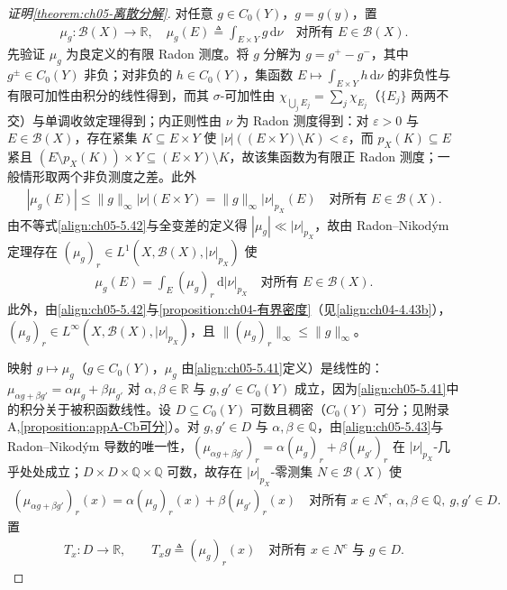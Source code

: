 \documentclass[../../main.tex]{subfiles}%
\begin{document}
\begin{proof}[证明\cref{theorem:ch05-离散分解}]
对任意 $g\in C_0(Y)$，$g=g(y)$，置
\begin{align}
\mu_g:\mathscr{B}(X)\to\mathbb{R},\quad
\mu_g(E)\triangleq \int_{E\times Y}g\,\mathrm{d}\nu
\quad\text{对所有 }E\in\mathscr{B}(X).\label{align:ch05-5.41}
\end{align}
先验证 $\mu_g$ 为良定义的有限 Radon 测度。将 $g$ 分解为 $g=g^+-g^-$，其中 $g^\pm\in C_0(Y)$ 非负；对非负的 $h\in C_0(Y)$，集函数 $E\mapsto\int_{E\times Y}h\,\mathrm{d}\nu$ 的非负性与有限可加性由积分的线性得到，而其 $\sigma$-可加性由 $\chi_{\bigcup_jE_j}=\sum_j\chi_{E_j}$（$\{E_j\}$ 两两不交）与单调收敛定理得到；内正则性由 $\nu$ 为 Radon 测度得到：对 $\varepsilon>0$ 与 $E\in\mathscr{B}(X)$，存在紧集 $K\subseteq E\times Y$ 使 $|\nu|((E\times Y)\setminus K)<\varepsilon$，而 $p_X(K)\subseteq E$ 紧且 $(E\setminus p_X(K))\times Y\subseteq(E\times Y)\setminus K$，故该集函数为有限正 Radon 测度；一般情形取两个非负测度之差。此外
\begin{align}
|\mu_g(E)|\leqslant\|g\|_\infty|\nu|(E\times Y)
=\|g\|_\infty|\nu|_{p_X}(E)
\quad\text{对所有 }E\in\mathscr{B}(X).\label{align:ch05-5.42}
\end{align}
由不等式\eqref{align:ch05-5.42}与全变差的定义得 $|\mu_g|\ll|\nu|_{p_X}$，故由 Radon--Nikodým 定理存在 $(\mu_g)_r\in L^1(X,\mathscr{B}(X),|\nu|_{p_X})$ 使
\begin{align}
\mu_g(E)=\int_E(\mu_g)_r\,\mathrm{d}|\nu|_{p_X}
\quad\text{对所有 }E\in\mathscr{B}(X).\label{align:ch05-5.43}
\end{align}
此外，由\eqref{align:ch05-5.42}与\cref{proposition:ch04-有界密度}（见\eqref{align:ch04-4.43b}），$(\mu_g)_r\in L^\infty(X,\mathscr{B}(X),|\nu|_{p_X})$，且 $\|(\mu_g)_r\|_\infty\leqslant\|g\|_\infty$。

映射 $g\mapsto\mu_g$（$g\in C_0(Y)$，$\mu_g$ 由\eqref{align:ch05-5.41}定义）是线性的：$\mu_{\alpha g+\beta g'}=\alpha\mu_g+\beta\mu_{g'}$ 对 $\alpha,\beta\in\mathbb{R}$ 与 $g,g'\in C_0(Y)$ 成立，因为\eqref{align:ch05-5.41}中的积分关于被积函数线性。设 $D\subseteq C_0(Y)$ 可数且稠密（$C_0(Y)$ 可分；见附录 A,\cref{proposition:appA-Cb可分}）。对 $g,g'\in D$ 与 $\alpha,\beta\in\mathbb{Q}$，由\eqref{align:ch05-5.43}与 Radon--Nikodým 导数的唯一性，$(\mu_{\alpha g+\beta g'})_r=\alpha(\mu_g)_r+\beta(\mu_{g'})_r$ 在 $|\nu|_{p_X}$-几乎处处成立；$D\times D\times\mathbb{Q}\times\mathbb{Q}$ 可数，故存在 $|\nu|_{p_X}$-零测集 $N\in\mathscr{B}(X)$ 使
\begin{align}
(\mu_{\alpha g+\beta g'})_r(x)=\alpha(\mu_g)_r(x)+\beta(\mu_{g'})_r(x)
\quad\text{对所有 }x\in N^c,\ \alpha,\beta\in\mathbb{Q},\ g,g'\in D.\label{align:ch05-5.44}
\end{align}
置
\begin{align*}
T_x:D\to\mathbb{R},\qquad T_xg\triangleq (\mu_g)_r(x)
\quad\text{对所有 }x\in N^c\text{ 与 }g\in D.
\end{align*}


\end{proof}
\end{document}
